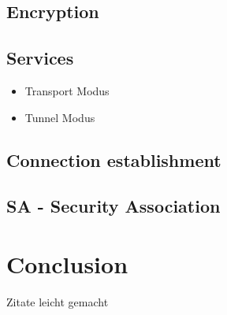 \documentclass[11pt,a4paper]{article}
\begin{document}
\subsection{Encryption}
\subsection{Services}
\begin{itemize}
	\item Transport Modus
	\item Tunnel Modus
\end{itemize}
\subsection{Connection establishment}
\subsection{SA - Security Association}
\newpage

\section{Conclusion}

\newpage
\begin{thebibliography}{999}
	 Zitate leicht gemacht
\end{thebibliography}
\end{document}
